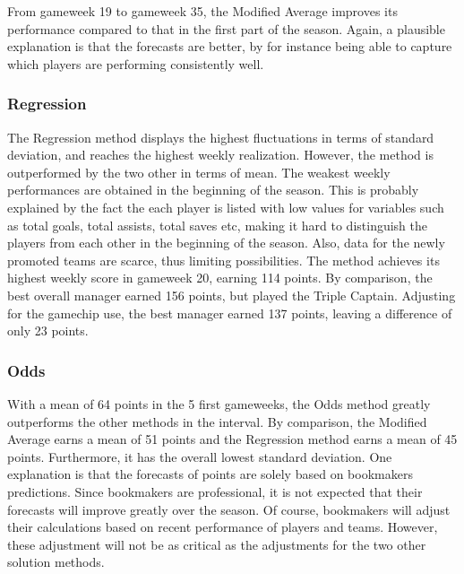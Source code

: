 \newpar

From gameweek 19 to gameweek 35, the Modified Average improves its performance compared to that in the first part of the season. Again, a plausible explanation is that the forecasts are better, by for instance being able to capture which players are performing consistently well.


\subsubsection{Regression}

The Regression method displays the highest fluctuations in terms of standard deviation, and reaches the highest weekly realization. However, the method is outperformed by the two other in terms of mean. The weakest weekly performances are obtained in the beginning of the season. This is probably explained by the fact the each player is listed with low values for variables such as total goals, total assists, total saves etc, making it hard to distinguish the players from each other in the beginning of the season. Also, data for the newly promoted teams are scarce, thus limiting possibilities. The method achieves its highest weekly score in gameweek 20, earning 114 points. By comparison, the best overall manager earned 156 points, but played the Triple Captain. Adjusting for the gamechip use, the best manager earned 137 points, leaving a difference of only 23 points.

\subsubsection{Odds}

\newpar

With a mean of 64 points in the 5 first gameweeks, the Odds method greatly outperforms the other methods in the interval. By comparison, the Modified Average earns a mean of 51 points and the Regression method earns a mean of 45 points. Furthermore, it has the overall lowest standard deviation. One explanation is that the forecasts of points are solely based on bookmakers predictions. Since bookmakers are professional, it is not expected that their forecasts will improve greatly over the season. Of course, bookmakers will adjust their calculations based on recent performance of players and teams. However, these adjustment will not be as critical as the adjustments for the two other solution methods. 

